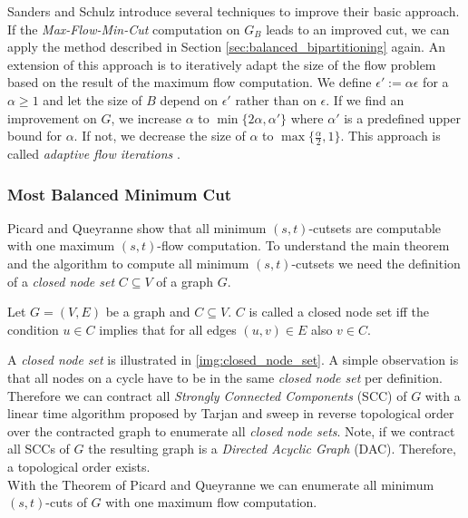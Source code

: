 Sanders and Schulz \cite{sanders2011engineering} introduce several techniques to improve
their basic approach. If the \emph{Max-Flow-Min-Cut} computation on $G_B$ leads to an
improved cut, we can apply the method described in Section 
\ref{sec:balanced_bipartitioning} again. An extension of this approach is to iteratively adapt the
size of the flow problem based on the result of the maximum flow computation.
We define $\epsilon' := \alpha\epsilon$ for a $\alpha \ge 1$ and let the size of $B$ depend
on $\epsilon'$ rather than on $\epsilon$. If we find an improvement on $G$, we
increase $\alpha$ to $\min\{2\alpha, \alpha'\}$ where $\alpha'$ is a predefined upper bound
for $\alpha$. If not, we decrease the size of $\alpha$ to 
$\max\{\frac{\alpha}{2},1\}$. This approach is called
\emph{adaptive flow iterations} \cite{sanders2011engineering}.

\subsubsection{Most Balanced Minimum Cut}
\label{sec:related_mbmc}

Picard and Queyranne \cite{picard1980structure} show that all minimum $(s,t)$-cutsets 
are computable with one maximum $(s,t)$-flow computation.
To understand the main theorem and the algorithm to compute all minimum $(s,t)$-cutsets we
need the definition of a \emph{closed node set} $C \subseteq V$ of a graph $G$.

\begin{definition}
Let $G = (V,E)$ be a graph and $C \subseteq V$. $C$ is called a closed node set iff the 
condition $u \in C$ implies that for all edges $(u,v) \in E$ also $v \in C$.
\end{definition}

A \emph{closed node set} is illustrated in \autoref{img:closed_node_set}. A simple observation
is that all nodes on a cycle have to be in the same \emph{closed node set} per definition. Therefore
we can contract all \emph{Strongly Connected Components} (SCC) of $G$ with a linear time algorithm
proposed by Tarjan \cite{tarjan1972depth} and sweep in reverse
topological order over the contracted graph to enumerate all \emph{closed node sets}. Note, if
we contract all SCCs of $G$ the resulting graph is a \emph{Directed Acyclic Graph} (DAC). Therefore, 
a topological order exists.\\
With the Theorem of Picard and Queyranne \cite{picard1980structure} we can enumerate
all minimum $(s,t)$-cuts of $G$ with one maximum flow computation.

